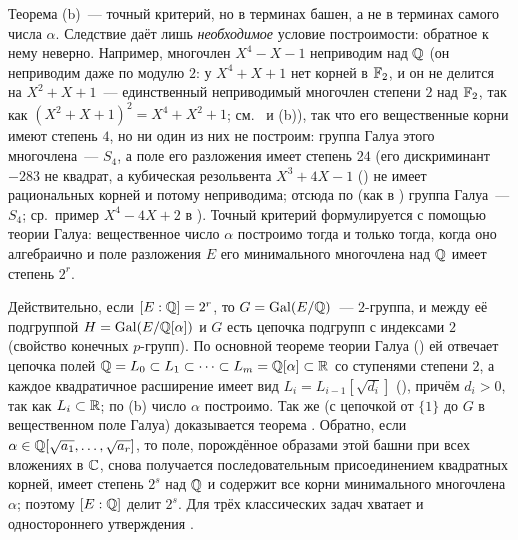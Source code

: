 \begin{center}
\begin{keepfig}
\centering
{}
\end{keepfig}
\end{center}

\begin{remark}
Теорема (b)~--- точный критерий, но в терминах башен, а не в терминах самого числа $\alpha$. Следствие 
даёт лишь \emph{необходимое} условие построимости: обратное к нему неверно. Например, многочлен $X^4-X-1$ неприводим
над $\mathbb Q$ (он неприводим даже по модулю $2$: у $X^4+X+1$ нет корней в $\mathbb F_2$, и он не делится на $X^2+X+1$~---
единственный неприводимый многочлен степени $2$ над $\mathbb F_2$, так как $(X^2+X+1)^2=X^4+X^2+1$; см.\  и (b)),
так что его вещественные корни имеют степень $4$, но ни один из них не построим: группа Галуа этого многочлена~---
$S_4$, а поле его разложения имеет степень $24$ (его дискриминант $-283$ не квадрат, а кубическая резольвента
$X^3+4X-1$ () не имеет рациональных корней и потому неприводима; отсюда по  (как в ) группа Галуа~---
$S_4$; ср.\ пример $X^4-4X+2$ в ). Точный критерий формулируется с помощью теории Галуа: вещественное число $\alpha$ построимо тогда и только
тогда, когда оно алгебраично и поле разложения $E$ его минимального многочлена над $\mathbb Q$ имеет степень $2^r$.

Действительно, если $[E:\mathbb Q]=2^r$, то $G=\operatorname{Gal}(E/\mathbb Q)$~--- $2$-группа, и между её подгруппой $H=\operatorname{Gal}(E/\mathbb Q[\alpha])$ и $G$ есть
цепочка подгрупп с индексами $2$ (свойство конечных $p$-групп). По основной теореме теории Галуа () ей
отвечает цепочка полей $\mathbb Q=L_0\subset L_1\subset\dots\subset L_m=\mathbb Q[\alpha]\subset\mathbb R$ со ступенями степени $2$, а каждое
квадратичное расширение имеет вид $L_{i}=L_{i-1}[\sqrt{d_i}]$ (), причём $d_i>0$, так как $L_i\subset\mathbb R$; по (b)
число $\alpha$ построимо. Так же (с цепочкой от $\{1\}$ до $G$ в вещественном поле Галуа) доказывается теорема . Обратно, если $\alpha\in\mathbb Q[\sqrt{a_1},\dots,\sqrt{a_r}]$,
то поле, порождённое образами этой башни при всех вложениях в $\mathbb C$, снова получается последовательным
присоединением квадратных корней, имеет степень $2^s$ над $\mathbb Q$ и содержит все корни минимального многочлена $\alpha$;
поэтому $[E:\mathbb Q]$ делит $2^s$. Для трёх классических задач хватает и одностороннего утверждения .
\end{remark}

